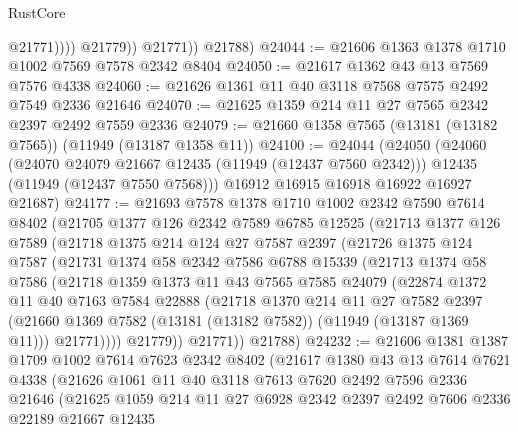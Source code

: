 \begin{lexlean}{RustCore}
\begin{coremodule}
                      @21771))))
              @21779))
          @21771))
      @21788)
@24044 := @21606 @1363 @1378 @1710 @1002 @7569 @7578 @2342 @8404
@24050 := @21617 @1362 @43 @13 @7569 @7576 @4338
@24060 := @21626 @1361 @11 @40 @3118 @7568 @7575 @2492 @7549 @2336 @21646
@24070 := @21625 @1359 @214 @11 @27 @7565 @2342 @2397 @2492 @7559 @2336
@24079 := @21660 @1358 @7565 (@13181 (@13182 @7565)) (@11949 (@13187 @1358 @11))
@24100 := @24044
    (@24050
      (@24060
        (@24070 @24079 @21667 @12435 (@11949 (@12437 @7560 @2342)))
        @12435
        (@11949 (@12437 @7550 @7568)))
      @16912
      @16915
      @16918
      @16922
      @16927
      @21687)
@24177 := @21693
    @7578
    @1378
    @1710
    @1002
    @2342
    @7590
    @7614
    @8402
    (@21705
      @1377
      @126
      @2342
      @7589
      @6785
      @12525
      (@21713
        @1377
        @126
        @7589
        (@21718
          @1375
          @214
          @124
          @27
          @7587
          @2397
          (@21726
            @1375
            @124
            @7587
            (@21731
              @1374
              @58
              @2342
              @7586
              @6788
              @15339
              (@21713
                @1374
                @58
                @7586
                (@21718
                  @1359
                  @1373
                  @11
                  @43
                  @7565
                  @7585
                  @24079
                  (@22874
                    @1372
                    @11
                    @40
                    @7163
                    @7584
                    @22888
                    (@21718
                      @1370
                      @214
                      @11
                      @27
                      @7582
                      @2397
                      (@21660 @1369 @7582 (@13181 (@13182 @7582)) (@11949 (@13187 @1369 @11)))
                      @21771))))
              @21779))
          @21771))
      @21788)
@24232 := @21606
    @1381
    @1387
    @1709
    @1002
    @7614
    @7623
    @2342
    @8402
    (@21617
      @1380
      @43
      @13
      @7614
      @7621
      @4338
      (@21626
        @1061
        @11
        @40
        @3118
        @7613
        @7620
        @2492
        @7596
        @2336
        @21646
        (@21625
          @1059
          @214
          @11
          @27
          @6928
          @2342
          @2397
          @2492
          @7606
          @2336
          @22189
          @21667
          @12435

\end{coremodule}
\end{lexlean}
